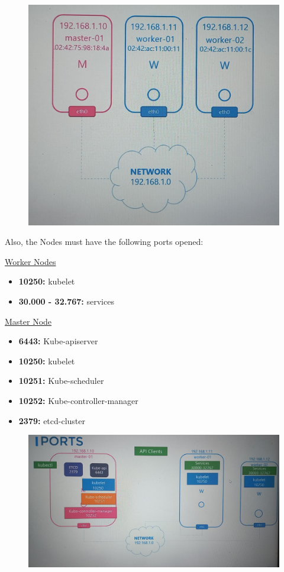 \documentclass{article}
\begin{document}
\begin{figure}[H]
    \centering
    \includegraphics[scale=0.2]{pictures/locura1.png}
\end{figure}

Also, the Nodes must have the following ports opened:

\underline{Worker Nodes}
\begin{itemize}
    \item \textbf{10250:} kubelet
    \item \textbf{30.000 - 32.767:} services
\end{itemize}

\underline{Master Node}
\begin{itemize}
    \item \textbf{6443:} Kube-apiserver
    \item \textbf{10250:} kubelet
    \item \textbf{10251:} Kube-scheduler
    \item \textbf{10252:} Kube-controller-manager
    \item \textbf{2379:} etcd-cluster
\end{itemize}

\begin{figure}[H]
    \includegraphics[width=\textwidth]{pictures/ports.png}
\end{figure}
\end{document}
